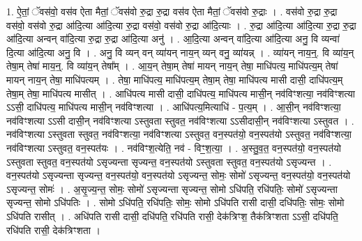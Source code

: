 \documentclass[17pt]{extarticle}
\begin{document}
1. ऐ॒तां॒ ॅवस॑वो॒ वस॑व ऐता मैतां॒ ॅवस॑वो रु॒द्रा रु॒द्रा वस॑व ऐता मैतां॒ ॅवस॑वो रु॒द्राः । . वस॑वो रु॒द्रा रु॒द्रा वस॑वो॒ वस॑वो रु॒द्रा आ॑दि॒त्या आ॑दि॒त्या रु॒द्रा वस॑वो॒ वस॑वो रु॒द्रा आ॑दि॒त्याः । . रु॒द्रा आ॑दि॒त्या आ॑दि॒त्या रु॒द्रा रु॒द्रा आ॑दि॒त्या अन्वन् वा॑दि॒त्या रु॒द्रा रु॒द्रा आ॑दि॒त्या अनु॑ । . आ॒दि॒त्या अन्वन् वा॑दि॒त्या आ॑दि॒त्या अनु॒ वि व्यन्वा॑ दि॒त्या आ॑दि॒त्या अनु॒ वि । . अनु॒ वि व्यन् वन् व्या॑यन् नाय॒न् व्यन् वनु॒ व्या॑यन्न् । . व्या॑यन् नाय॒न्॒. वि व्या॑य॒न् तेषा॒म् तेषा॑ माय॒न्॒. वि व्या॑य॒न् तेषा᳚म् । . आ॒य॒न् तेषा॒म् तेषा॑ मायन् नाय॒न् तेषा॒ माधि॑पत्य॒ माधि॑पत्य॒म् तेषा॑ मायन् नाय॒न् तेषा॒ माधि॑पत्यम् । . तेषा॒ माधि॑पत्य॒ माधि॑पत्य॒म् तेषा॒म् तेषा॒ माधि॑पत्य मासी दासी॒ दाधि॑पत्य॒म् तेषा॒म् तेषा॒ माधि॑पत्य मासीत् । . आधि॑पत्य मासी दासी॒ दाधि॑पत्य॒ माधि॑पत्य मासी॒न् नव॑विꣳशत्या॒ नव॑विꣳशत्या ऽऽसी॒ दाधि॑पत्य॒ माधि॑पत्य मासी॒न् नव॑विꣳशत्या । . आधि॑पत्य॒मित्याधि॑ - प॒त्य॒म् । . आ॒सी॒न् नव॑विꣳशत्या॒ नव॑विꣳशत्या ऽऽसी दासी॒न् नव॑विꣳशत्या ऽस्तुवता स्तुवत॒ नव॑विꣳशत्या ऽऽसीदासी॒न् नव॑विꣳशत्या ऽस्तुवत । . नव॑विꣳशत्या ऽस्तुवता स्तुवत॒ नव॑विꣳशत्या॒ नव॑विꣳशत्या ऽस्तुवत॒ वन॒स्पत॑यो॒ 
वन॒स्पत॑यो ऽस्तुवत॒ नव॑विꣳशत्या॒ नव॑विꣳशत्या ऽस्तुवत॒ वन॒स्पत॑यः । . नव॑विꣳश॒त्येति॒ नव॑ - विꣳ॒॒श॒त्या॒ । . अ॒स्तु॒व॒त॒ वन॒स्पत॑यो॒ वन॒स्पत॑यो ऽस्तुवता स्तुवत॒ वन॒स्पत॑यो ऽसृज्यन्ता सृज्यन्त॒ वन॒स्पत॑यो ऽस्तुवता स्तुवत॒ वन॒स्पत॑यो ऽसृज्यन्त । . वन॒स्पत॑यो ऽसृज्यन्ता सृज्यन्त॒ वन॒स्पत॑यो॒ वन॒स्पत॑यो ऽसृज्यन्त॒ सोमः॒ सोमो॑ ऽसृज्यन्त॒ वन॒स्पत॑यो॒ वन॒स्पत॑यो ऽसृज्यन्त॒ सोमः॑ । . अ॒सृ॒ज्य॒न्त॒ सोमः॒ सोमो॑ ऽसृज्यन्ता सृज्यन्त॒ सोमो ऽधि॑पति॒ रधि॑पतिः॒ सोमो॑ ऽसृज्यन्ता सृज्यन्त॒ सोमो ऽधि॑पतिः । . सोमो ऽधि॑पति॒ रधि॑पतिः॒ सोमः॒ सोमो ऽधि॑पति रासी दासी॒ दधि॑पतिः॒ सोमः॒ सोमो ऽधि॑पति रासीत् । . अधि॑पति रासी दासी॒ दधि॑पति॒ रधि॑पति रासी॒ देक॑त्रिꣳश॒ तैक॑त्रिꣳशता ऽऽसी॒ दधि॑पति॒ रधि॑पति रासी॒ देक॑त्रिꣳशता । \newline
\end{document}
